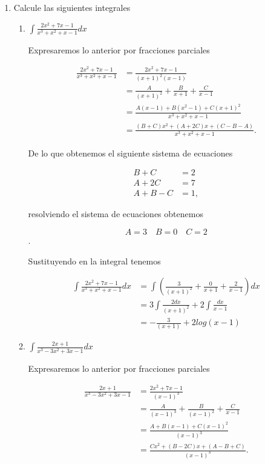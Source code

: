 \documentclass[letterpaper]{article}
\theoremstyle{definition}
\theoremstyle{definition}
\begin{document}
\begin{enumerate}
\begin{enumerate}
  \end{enumerate}

  \item Calcule las siguientes integrales
  
  \begin{enumerate}
    \item $\int \frac{2x^2+7x-1}{x^3+x^2+x-1}dx$
    
    Expresaremos lo anterior por fracciones parciales

    \begin{align*}
      \frac{2x^2+7x-1}{x^3+x^2+x-1} &= \frac{2x^2+7x-1}{(x+1)^2(x-1)}\\
      &= \frac{A}{(x+1)^2 }+ \frac{B}{x+1} + \frac{C}{x-1}\\
      &= \frac{A(x-1) + B(x^2-1) + C(x+1)^2}{x^3+x^2+x-1}\\
      &= \frac{(B+C)x^2 + (A+2C)x + (C-B-A)}{x^3+x^2+x-1}.
    \end{align*}

    De lo que obtenemos el siguiente sistema de ecuaciones

    \begin{align*}
      B + C &= 2\\
      A + 2C &= 7\\
      A + B - C &= 1,
    \end{align*}

    resolviendo el sistema de ecuaciones obtenemos

    \[A = 3 \quad B = 0 \quad C = 2\].

    Sustituyendo en la integral tenemos

    \begin{align*}
      \int \frac{2x^2+7x-1}{x^3+x^2+x-1}dx &= \int \left(\frac{3}{(x+1)^2}+ \frac{0}{x+1} + \frac{2}{x-1}\right)dx\\
      &= 3 \int \frac{2dx}{(x+1)^2} + 2\int \frac{dx}{x-1}\\
      &= -\frac{3}{(x+1)} + 2log(x-1)
    \end{align*}

    \item $\int \frac{2x+1}{x^3-3x^2+3x-1}dx$
    
    Expresaremos lo anterior por fracciones parciales

    \begin{align*}
      \frac{2x+1}{x^3-3x^2+3x-1} &= \frac{2x^2+7x-1}{(x-1)^3}\\
      &= \frac{A}{(x-1)^3}+ \frac{B}{(x-1)^2} + \frac{C}{x-1}\\
      &= \frac{A + B(x-1) +  C(x-1)^2}{(x-1)^3}\\
      &= \frac{Cx^2 + (B-2C)x + (A-B+C)}{(x-1)^3}.
    \end{align*}


\end{enumerate}
\end{enumerate}
\end{document}
